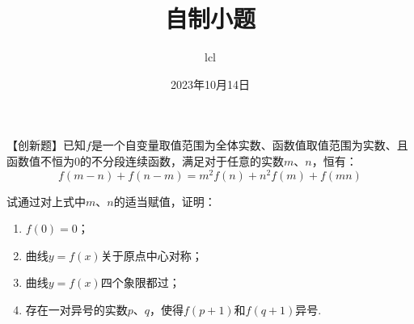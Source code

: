 \documentclass[11pt]{article}
\title{自制小题}
\date{2023年10月14日}
\author{lcl}
\begin{document}
\maketitle
【创新题】已知$f$是一个自变量取值范围为全体实数、函数值取值范围为实数、且函数值不恒为$0$的不分段连续函数，满足对于任意的实数$m$、$n$，恒有：
$$f(m-n)+f(n-m)=m^2f(n)+n^2f(m)+f(mn)$$

试通过对上式中$m$、$n$的适当赋值，证明：
\begin{enumerate}[（1）]
    \item $f(0)=0$；
    \item 曲线$y=f(x)$关于原点中心对称；
    \item 曲线$y=f(x)$四个象限都过；
    \item 存在一对异号的实数$p$、$q$，使得$f(p+1)$和$f(q+1)$异号.
\end{enumerate}
\end{document}
